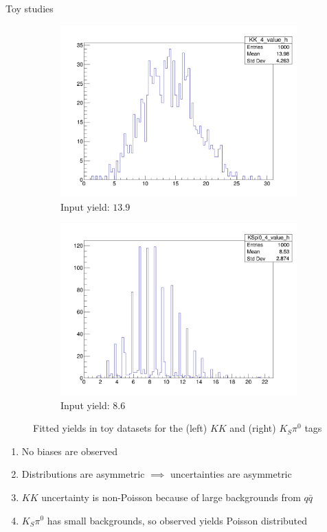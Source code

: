 \documentclass{beamer}
\begin{document}
\begin{frame}{Toy studies}
  \begin{figure}
    \centering
    \begin{subfigure}{0.5\textwidth}
      \centering
      \includegraphics[width=1.0\textwidth]{Plots/KK_ToyYields_Bin4.png}
      \caption{Input yield: $13.9$}
    \end{subfigure}%
    \begin{subfigure}{0.5\textwidth}
      \centering
      \includegraphics[width=1.0\textwidth]{Plots/KSpi0_ToyYields_Bin4.png}
      \caption{Input yield: $8.6$}
    \end{subfigure}
    \caption{Fitted yields in toy datasets for the (left) $KK$ and (right) $K_S\pi^0$ tags}
  \end{figure}
  \vspace{-0.4cm}
  \begin{enumerate}
    \item{No biases are observed}
    \item{Distributions are asymmetric $\implies$ uncertainties are asymmetric}
    \item{$KK$ uncertainty is non-Poisson because of large backgrounds from $q\bar{q}$}
    \item{$K_S\pi^0$ has small backgrounds, so observed yields Poisson distributed}
  \end{enumerate}
\end{frame}
\end{document}
